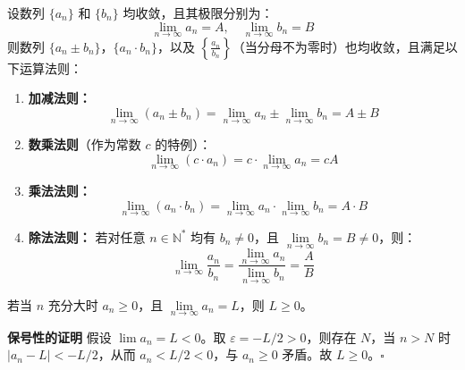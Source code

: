\documentclass[fontset=fandol]{ctexart}
\newenvironment{custom}[1]{\par\noindent\textbf{#1}\quad}{\par\vspace{0.8em}}
\begin{document}
\begin{proposition}[数列极限的四则运算法则]


设数列 $\{a_n\}$ 和 $\{b_n\}$ 均收敛，且其极限分别为：
\begin{equation*}
	\lim\limits_{n \to \infty} a_n = A, \quad \lim\limits_{n \to \infty} b_n = B
\end{equation*}
则数列 $\{a_n \pm b_n\}$，$\{a_n \cdot b_n\}$，以及 $\left\{\frac{a_n}{b_n}\right\}$（当分母不为零时）也均收敛，且满足以下运算法则：

\begin{enumerate}
	\item \textbf{加减法则：}
	\begin{equation*}
		\lim\limits_{n \to \infty} (a_n \pm b_n) = \lim\limits_{n \to \infty} a_n \pm \lim\limits_{n \to \infty} b_n = A \pm B
	\end{equation*}
	
	\item \textbf{数乘法则}（作为常数 $c$ 的特例）：
	\begin{equation*}
		\lim\limits_{n \to \infty} (c \cdot a_n) = c \cdot \lim\limits_{n \to \infty} a_n = cA
	\end{equation*}
	
	\item \textbf{乘法法则：}
	\begin{equation*}
		\lim_{n \to \infty} (a_n \cdot b_n) = \lim_{n \to \infty} a_n \cdot \lim_{n \to \infty} b_n = A \cdot B
	\end{equation*}
	
	\item \textbf{除法法则：}
	若对任意 $n \in \mathbb{N}^*$ 均有 $b_n \neq 0$，且 $\lim\limits_{n \to \infty} b_n = B \neq 0$，则：
	\begin{equation*}
		\lim_{n \to \infty} \frac{a_n}{b_n} = \frac{\lim\limits_{n \to \infty} a_n}{\lim\limits_{n \to \infty} b_n} = \frac{A}{B}
	\end{equation*}
\end{enumerate}
\end{proposition}




\begin{proposition}[极限的保号性]
	 若当 \(n\) 充分大时 \(a_n \geq 0\)，且 \(\lim\limits_{n \to \infty} a_n = L\)，则 \(L \geq 0\)。
\end{proposition}

\begin{custom}{保号性的证明}
	假设 \(\lim a_n = L < 0\)。取 \(\varepsilon = -L/2 > 0\)，则存在 \(N\)，当 \(n > N\) 时 \(|a_n - L| < -L/2\)，从而 \(a_n < L/2 < 0\)，与 \(a_n \geq 0\) 矛盾。故 \(L \geq 0\)。\(\square\)
\end{custom}
\end{document}
